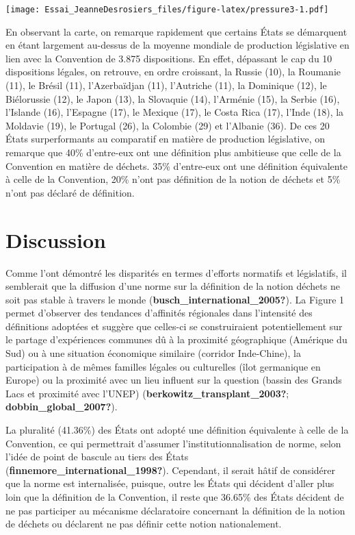 \documentclass[12pt]{ulaval}
\begin{document}
\texttt{[image: Essai\_JeanneDesrosiers\_files/figure-latex/pressure3-1.pdf]}

En observant la carte, on remarque rapidement que certains États se démarquent en étant largement au-dessus de la moyenne mondiale de production législative en lien avec la Convention de 3.875 dispositions. En effet, dépassant le cap du 10 dispositions légales, on retrouve, en ordre croissant, la Russie (10), la Roumanie (11), le Brésil (11), l'Azerbaïdjan (11), l'Autriche (11), la Dominique (12), le Biélorussie (12), le Japon (13), la Slovaquie (14), l'Arménie (15), la Serbie (16), l'Islande (16), l'Espagne (17), le Mexique (17), le Costa Rica (17), l'Inde (18), la Moldavie (19), le Portugal (26), la Colombie (29) et l'Albanie (36). De ces 20 États surperformants au comparatif en matière de production législative, on remarque que 40\% d'entre-eux ont une définition plus ambitieuse que celle de la Convention en matière de déchets. 35\% d'entre-eux ont une définition équivalente à celle de la Convention, 20\% n'ont pas définition de la notion de déchets et 5\% n'ont pas déclaré de définition.

\section{Discussion}\label{discussion}

Comme l'ont démontré les disparités en termes d'efforts normatifs et législatifs, il semblerait que la diffusion d'une norme sur la définition de la notion déchets ne soit pas stable à travers le monde (\textbf{busch\_international\_2005?}). La Figure 1 permet d'observer des tendances d'affinités régionales dans l'intensité des définitions adoptées et suggère que celles-ci se construiraient potentiellement sur le partage d'expériences communes dû à la proximité géographique (Amérique du Sud) ou à une situation économique similaire (corridor Inde-Chine), la participation à de mêmes familles légales ou culturelles (îlot germanique en Europe) ou la proximité avec un lieu influent sur la question (bassin des Grands Lacs et proximité avec l'UNEP) (\textbf{berkowitz\_transplant\_2003?}; \textbf{dobbin\_global\_2007?}).

La pluralité (41.36\%) des États ont adopté une définition équivalente à celle de la Convention, ce qui permettrait d'assumer l'institutionnalisation de norme, selon l'idée de point de bascule au tiers des États (\textbf{finnemore\_international\_1998?}). Cependant, il serait hâtif de considérer que la norme est internalisée, puisque, outre les États qui décident d'aller plus loin que la définition de la Convention, il reste que 36.65\% des États décident de ne pas participer au mécanisme déclaratoire concernant la définition de la notion de déchets ou déclarent ne pas définir cette notion nationalement.
\end{document}
